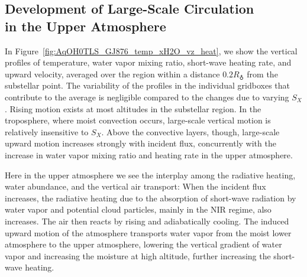 \documentclass[11pt,numberedappendix,twocolappendix,]{emulateapj}
\def\wv{water vapor}
\begin{document}
\subsection{Development of Large-Scale Circulation \\in the Upper Atmosphere}
\label{ss:result_omega}

In Figure~\ref{fig:AqOH0TLS_GJ876_temp_xH2O_vz_heat}, we show the vertical profiles of temperature, \wv{} mixing ratio, short-wave heating rate, and upward velocity, averaged over the region within a distance $0.2R_\earth$ from the substellar point. 
The variability of the profiles in the individual gridboxes that contribute to the average is negligible compared to the changes due to varying $S_X$. 
%
Rising motion exists at most altitudes in the substellar region.  In the troposphere, where moist convection occurs, large-scale vertical motion is relatively insensitive to $S_X$.  Above the convective layers, though, large-scale upward motion increases strongly with incident flux, concurrently with the increase in \wv{} mixing ratio and heating rate in the upper atmosphere. 

Here in the upper atmosphere we see the interplay among the radiative heating, water abundance, and the vertical air transport:  
When the incident flux increases, the radiative heating due to the absorption of short-wave radiation by \wv{} and potential cloud particles, mainly in the NIR regime, also increases. %
The air then reacts by rising and adiabatically cooling. %
The induced upward motion of the atmosphere transports water vapor from the moist lower atmosphere to the upper atmosphere, lowering the vertical gradient of water vapor and increasing the moisture at high altitude, further increasing the short-wave heating. 
\end{document}
